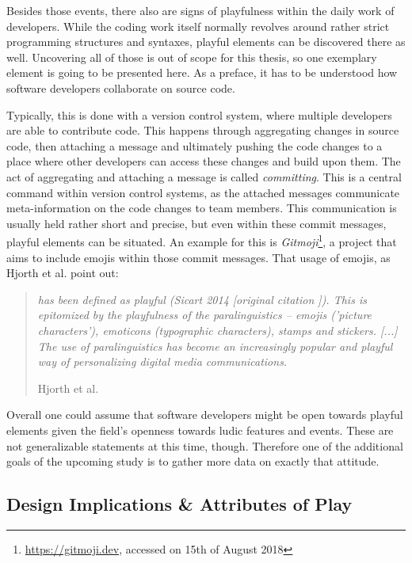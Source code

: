 Besides those events, there also are signs of playfulness within the daily work of developers. While the coding work itself normally revolves around rather strict programming structures and syntaxes, playful elements can be discovered there as well. Uncovering all of those is out of scope for this thesis, so one exemplary element is going to be presented here. As a preface, it has to be understood how software developers collaborate on source code.

Typically, this is done with a version control system, where multiple developers are able to contribute code. This happens through aggregating changes in source code, then attaching a message and ultimately pushing the code changes to a place where other developers can access these changes and build upon them. The act of aggregating and attaching a message is called \textit{committing}. This is a central command within version control systems, as the attached messages communicate meta-information on the code changes to team members. This communication is usually held rather short and precise, but even within these commit messages, playful elements can be situated. An example for this is \textit{Gitmoji}\footnote{\url{https://gitmoji.dev}, accessed on 15th of August 2018}, a project that aims to include emojis within those commit messages. That usage of emojis, as Hjorth et al. point out:

\begin{quote}
  \textit{has been defined as playful (Sicart 2014 [original citation \cite{sicart2014play}]). This is epitomized by the playfulness of the paralinguistics -- emojis ('picture characters'), emoticons (typographic characters), stamps and stickers. [...] The use of paralinguistics has become an increasingly popular and playful way of personalizing digital media communications.}

  \footnotesize{Hjorth et al. \cite{hjorth2018beyond}}
\end{quote}

Overall one could assume that software developers might be open towards playful elements given the field's openness towards ludic features and events. These are not generalizable statements at this time, though. Therefore one of the additional goals of the upcoming study is to gather more data on exactly that attitude.

\subsection{Design Implications \& Attributes of Play}

